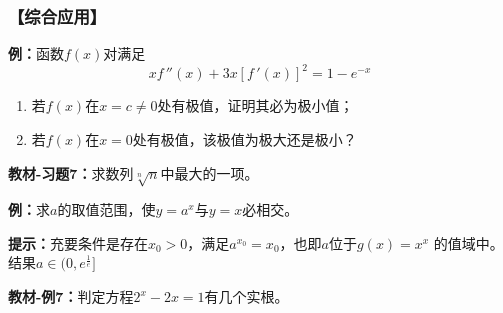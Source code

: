 \subsubsection{【综合应用】}

{\bf 例：}函数$f(x)$对满足
$$xf\,''(x)+3x[f\,'(x)]^2=1-e^{-x}$$
\begin{enumerate}[(1)]
  \setlength{\itemindent}{1cm}
  \item 若$f(x)$在$x=c\ne 0$处有极值，证明其必为极小值；
  \item 若$f(x)$在$x=0$处有极值，该极值为极大还是极小？
\end{enumerate}

{\bf 教材-习题7：}求数列$\sqrt[n]n$中最大的一项。

\begin{center}
\end{center}

{\bf 例：}求$a$的取值范围，使$y=a^x$与$y=x$必相交。

{\bf 提示：}充要条件是存在$x_0>0$，满足$a^{x_0}=x_0$，也即$a$位于$g(x)=x^{x}$
的值域中。结果$a\in(0,e^{\frac1e}]$

{\bf 教材-例7：}判定方程$2^x-2x=1$有几个实根。

\begin{center}
\end{center}

